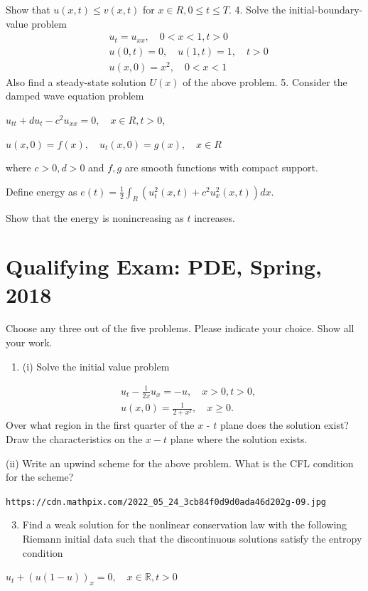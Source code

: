 \documentclass[10pt]{article}
\begin{document}
Show that $u(x, t) \leq v(x, t)$ for $x \in R, 0 \leq t \leq T$. 4. Solve the initial-boundary-value problem
$$
\begin{aligned}
&u_{t}=u_{x x}, \quad 0<x<1, t>0 \\
&u(0, t)=0, \quad u(1, t)=1, \quad t>0 \\
&u(x, 0)=x^{2}, \quad 0<x<1
\end{aligned}
$$
Also find a steady-state solution $U(x)$ of the above problem. 5. Consider the damped wave equation problem

$u_{t t}+d u_{t}-c^{2} u_{x x}=0, \quad x \in R, t>0$,

$u(x, 0)=f(x), \quad u_{t}(x, 0)=g(x), \quad x \in R$

where $c>0, d>0$ and $f, g$ are smooth functions with compact support.

Define energy as $e(t)=\frac{1}{2} \int_{R}\left(u_{t}^{2}(x, t)+c^{2} u_{x}^{2}(x, t)\right) d x$.

Show that the energy is nonincreasing as $t$ increases.

\section{Qualifying Exam: PDE, Spring, 2018}
Choose any three out of the five problems. Please indicate your choice. Show all your work.

\begin{enumerate}
  \item (i) Solve the initial value problem
\end{enumerate}
$$
\begin{aligned}
&u_{t}-\frac{1}{2 x} u_{x}=-u, \quad x>0, t>0, \\
&u(x, 0)=\frac{1}{2+x^{2}}, \quad x \geq 0 .
\end{aligned}
$$
Over what region in the first quarter of the $x$ - $t$ plane does the solution exist? Draw the characteristics on the $x-t$ plane where the solution exists.

(ii) Write an upwind scheme for the above problem. What is the CFL condition for the scheme?

\texttt{https://cdn.mathpix.com/2022_05_24_3cb84f0d9d0ada46d202g-09.jpg}

\begin{enumerate}
  \setcounter{enumi}{2}
  \item Find a weak solution for the nonlinear conservation law with the following Riemann initial data such that the discontinuous solutions satisfy the entropy condition
\end{enumerate}
$u_{t}+(u(1-u))_{x}=0, \quad x \in \mathbb{R}, t>0$
\end{document}
